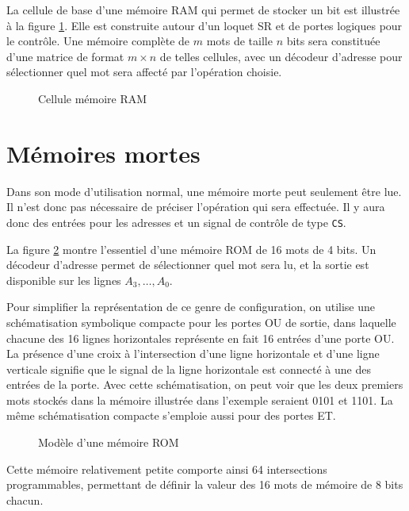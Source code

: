 \documentclass[letter, oneside]{book}
\begin{document}
\begin{enumerate}
La cellule de base d'une mémoire RAM qui permet de stocker un bit est
illustrée à la figure \ref{fig:orga0e1c34}. Elle est construite autour d'un
loquet SR et de portes logiques pour le contrôle. Une mémoire complète
de \(m\) mots de taille \(n\) bits sera constituée d'une matrice de
format \(m \times n\) de telles cellules, avec un décodeur d'adresse
pour sélectionner quel mot sera affecté par l'opération choisie.

\begin{figure}[htbp]
\centering

\caption{\label{fig:orga0e1c34}Cellule mémoire RAM}
\end{figure}
\end{enumerate}


\section{Mémoires mortes}
\label{sec:org7f1e28e}

Dans son mode d'utilisation normal, une mémoire morte peut seulement
être lue. Il n'est donc pas nécessaire de préciser l'opération qui
sera effectuée. Il y aura donc des entrées pour les adresses et un
signal de contrôle de type \texttt{CS}.

La figure \ref{fig:orga8e9402} montre l'essentiel d'une mémoire ROM de
16 mots de 4 bits. Un décodeur d'adresse permet de sélectionner quel
mot sera lu, et la sortie est disponible sur les lignes \(A_3, \ldots,
A_0\). 

Pour simplifier la représentation de ce genre de configuration, on
utilise une schématisation symbolique compacte pour les portes OU de
sortie, dans laquelle chacune des 16 lignes horizontales représente en
fait 16 entrées d'une porte OU. La présence d'une croix à
l'intersection d'une ligne horizontale et d'une ligne verticale
signifie que le signal de la ligne horizontale est connecté à une des
entrées de la porte.  Avec cette schématisation, on peut voir que les
deux premiers mots stockés dans la mémoire illustrée dans l'exemple
seraient 0101 et 1101. La même schématisation compacte s'emploie aussi
pour des portes ET.


\begin{figure}[htbp]
\centering

\caption{\label{fig:orga8e9402}Modèle d'une mémoire ROM}
\end{figure}

Cette mémoire relativement petite comporte ainsi 64 intersections
programmables, permettant de définir la valeur des 16 mots de mémoire
de 8 bits chacun.
\end{document}

